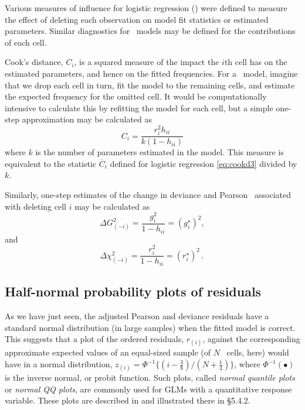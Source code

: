 Various measures of influence for logistic regression  () were defined to measure the effect
of deleting each observation on model fit statistics or estimated
parameters.  Similar diagnostics for \loglin\ models may be
defined for the contributions of each cell.

Cook's distance, $C_i$, is a squared measure of the
impact the $i$th cell has on the estimated parameters, and hence on
the fitted frequencies.
For a \loglin\ model, imagine that we drop
each cell in turn, fit the model to the remaining cells,
and estimate the expected frequency for the omitted cell.
It would be computationally intensive to calculate this by refitting
the model for each cell, but a simple one-step approximation
\citep[Section 10.7]{Christensen:97} may
be calculated as
\begin{equation}\label{eq:cookdlog}
C_i = \frac{r_i^2 h_{ii}} {k(1-h_{ii} )}
\end{equation}
where $k$ is the number of parameters estimated in the model.
This measure is equivalent to the statistic $\overline{C}_i$
defined for logistic regression \eqref{eq:cookd3} divided by $k$.

Similarly, one-step estimates of the change in deviance
and Pearson \chisq\ associated with deleting cell $i$ may be calculated
as
\begin{equation*}%
  \Delta G_{(-i)}^2 = \frac{g_i^2}{1-h_{ii}} = (g_i^{\star})^2
  \comma
\end{equation*}
and
\begin{equation*}%
  \Delta \chi_{(-i)}^2 = \frac{r_i^2}{1-h_{ii}} = (r_i^{\star})^2
  \period
\end{equation*}

\subsection{Half-normal probability plots of residuals}\label{sec:loglin-halfnorm}
As we have just seen, the adjusted Pearson and deviance residuals have a standard normal
distribution (in large samples)
when the fitted model is correct.
This suggests that a plot of the ordered residuals, $r_{(i)}$, against the
corresponding approximate expected values of
an equal-sized sample (of $N$ \ctab\ cells, here) would have in a
normal distribution,
$z_{(i)} = \Phi^{-1} \{ (i-\frac{3}{8}) / ( N + \frac{1}{4}) \}$,
where $\Phi^{-1} (\bullet)$ is the inverse normal, or probit function.
Such plots, called \emph{normal quantile plots}
or \emph{normal QQ plots}, are commonly
used for GLMs with a quantitative response variable.
These plots are described in  and illustrated there in \S 5.4.2.

